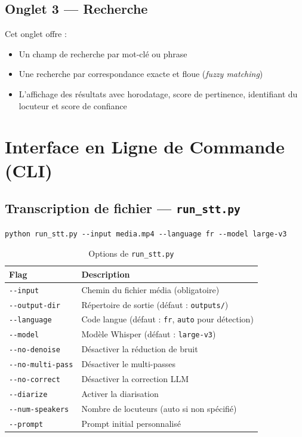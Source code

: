 \documentclass[12pt,a4paper]{report}
\begin{document}
\section{Onglet 3 — Recherche}

Cet onglet offre :
\begin{itemize}
    \item Un champ de recherche par mot-clé ou phrase
    \item Une recherche par correspondance exacte et floue (\textit{fuzzy matching})
    \item L'affichage des résultats avec horodatage, score de pertinence, identifiant du locuteur et score de confiance
\end{itemize}

\chapter{Interface en Ligne de Commande (CLI)}

\section{Transcription de fichier — \texttt{run\_stt.py}}

\begin{lstlisting}[style=bash, title=Utilisation de run\_stt.py]
python run_stt.py --input media.mp4 --language fr --model large-v3
\end{lstlisting}

\begin{table}[H]
    \centering
    \caption{Options de \texttt{run\_stt.py}}
    \label{tab:cli_stt}
    \begin{tabular}{@{} l p{8cm} @{}}
        \toprule
        \textbf{Flag} & \textbf{Description} \\
        \midrule
        \texttt{-{}-input} & Chemin du fichier média (obligatoire) \\
        \texttt{-{}-output-dir} & Répertoire de sortie (défaut : \texttt{outputs/}) \\
        \texttt{-{}-language} & Code langue (défaut : \texttt{fr}, \texttt{auto} pour détection) \\
        \texttt{-{}-model} & Modèle Whisper (défaut : \texttt{large-v3}) \\
        \texttt{-{}-no-denoise} & Désactiver la réduction de bruit \\
        \texttt{-{}-no-multi-pass} & Désactiver le multi-passes \\
        \texttt{-{}-no-correct} & Désactiver la correction LLM \\
        \texttt{-{}-diarize} & Activer la diarisation \\
        \texttt{-{}-num-speakers} & Nombre de locuteurs (auto si non spécifié) \\
        \texttt{-{}-prompt} & Prompt initial personnalisé \\
        \bottomrule
    \end{tabular}
\end{table}
\end{document}
